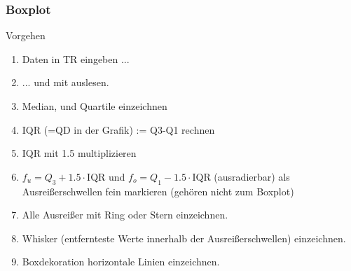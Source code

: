 \begin{multicols}{2}
\subsubsection{Boxplot}
Vorgehen
\begin{enumerate}
\item Daten in TR eingeben ...
\item ... und mit  auslesen.
\item Median, und Quartile einzeichnen
\item IQR (=QD in der Grafik) := Q3-Q1 rechnen
\item IQR mit 1.5 multiplizieren
\item $f_u = Q_3 + 1.5\cdot{}\textrm{IQR}$ und $f_o=Q_1 - 1.5\cdot{}\textrm{IQR}$ (ausradierbar) als
Ausreißerschwellen fein markieren (gehören nicht zum Boxplot)
\item Alle Ausreißer mit Ring oder Stern einzeichnen.
\item Whisker (entfernteste Werte innerhalb der Ausreißerschwellen)
einzeichnen.
\item Boxdekoration horizontale Linien einzeichnen.
\end{enumerate}
\end{multicols}


\newpage

